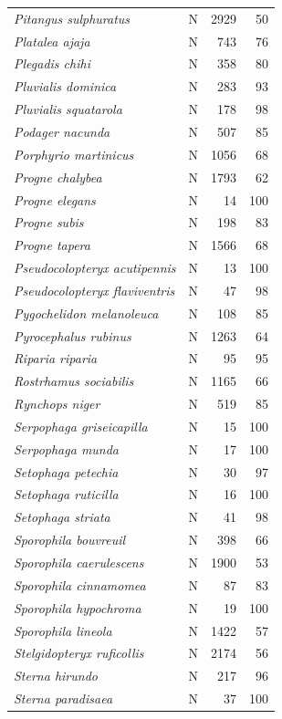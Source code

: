 \documentclass[
  oneside]{scrbook}
\begin{document}
\begin{longtable}[t]{>{}llrr}
\addlinespace
\em{Pitangus sulphuratus} & N & 2929 & 50\\
\em{Platalea ajaja} & N & 743 & 76\\
\em{Plegadis chihi} & N & 358 & 80\\
\em{Pluvialis dominica} & N & 283 & 93\\
\em{Pluvialis squatarola} & N & 178 & 98\\
\addlinespace
\em{Podager nacunda} & N & 507 & 85\\
\em{Porphyrio martinicus} & N & 1056 & 68\\
\em{Progne chalybea} & N & 1793 & 62\\
\em{Progne elegans} & N & 14 & 100\\
\em{Progne subis} & N & 198 & 83\\
\addlinespace
\em{Progne tapera} & N & 1566 & 68\\
\em{Pseudocolopteryx acutipennis} & N & 13 & 100\\
\em{Pseudocolopteryx flaviventris} & N & 47 & 98\\
\em{Pygochelidon melanoleuca} & N & 108 & 85\\
\em{Pyrocephalus rubinus} & N & 1263 & 64\\
\addlinespace
\em{Riparia riparia} & N & 95 & 95\\
\em{Rostrhamus sociabilis} & N & 1165 & 66\\
\em{Rynchops niger} & N & 519 & 85\\
\em{Serpophaga griseicapilla} & N & 15 & 100\\
\em{Serpophaga munda} & N & 17 & 100\\
\addlinespace
\em{Setophaga petechia} & N & 30 & 97\\
\em{Setophaga ruticilla} & N & 16 & 100\\
\em{Setophaga striata} & N & 41 & 98\\
\em{Sporophila bouvreuil} & N & 398 & 66\\
\em{Sporophila caerulescens} & N & 1900 & 53\\
\addlinespace
\em{Sporophila cinnamomea} & N & 87 & 83\\
\em{Sporophila hypochroma} & N & 19 & 100\\
\em{Sporophila lineola} & N & 1422 & 57\\
\em{Stelgidopteryx ruficollis} & N & 2174 & 56\\
\em{Sterna hirundo} & N & 217 & 96\\
\addlinespace
\em{Sterna paradisaea} & N & 37 & 100\\

\end{longtable}
\end{document}
